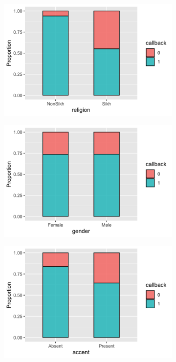\documentclass[11pt]{article}
\begin{document}
\begin{figure}[!b]
    \centering
    \begin{subfigure}{0.45\textwidth}
        \centering
        \includegraphics[width=\textwidth]{../../Plots/Proportions_callback_religion.png}
        \caption{}
    \end{subfigure}
    \begin{subfigure}{0.45\textwidth}
        \centering
        \includegraphics[width=\textwidth]{../../Plots/Proportions_callback_gender.png}
        \caption{}
    \end{subfigure}
    \begin{subfigure}{0.45\textwidth}
        \centering
        \includegraphics[width=\textwidth]{../../Plots/Proportions_callback_accent.png}

\end{subfigure}
\end{figure}
\end{document}
